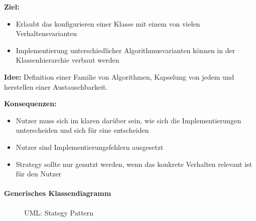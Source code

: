 \documentclass[a4paper, 11pt, accentcolor = tud3b]{tudreport}
\begin{document}
					\textbf{Ziel:}
						\begin{itemize}
							\item Erlaubt das konfigurieren einer Klasse mit einem von vielen Verhaltensvarianten
							\item Implementierung unterschiedlicher Algorithmusvarianten können in der Klassenhierarchie verbaut werden
						\end{itemize}
					
					\textbf{Idee:} Definition einer Familie von Algorithmen, Kapselung von jedem und herstellen einer Austauschbarkeit.
					
					\textbf{Konsequenzen:}
						\begin{itemize}
							\item Nutzer muss sich im klaren darüber sein, wie sich die Implementierungen unterscheiden und sich für eine entscheiden
							\item Nutzer sind Implementierungsfehlern ausgesetzt
							\item Strategy sollte nur genutzt werden, wenn das konkrete Verhalten relevant ist für den Nutzer
						\end{itemize}
				
				\paragraph{Generisches Klassendiagramm}
					\begin{figure}[ht]
						\centering
						\caption{UML: Stategy Pattern}
					\end{figure}
				
\end{document}
